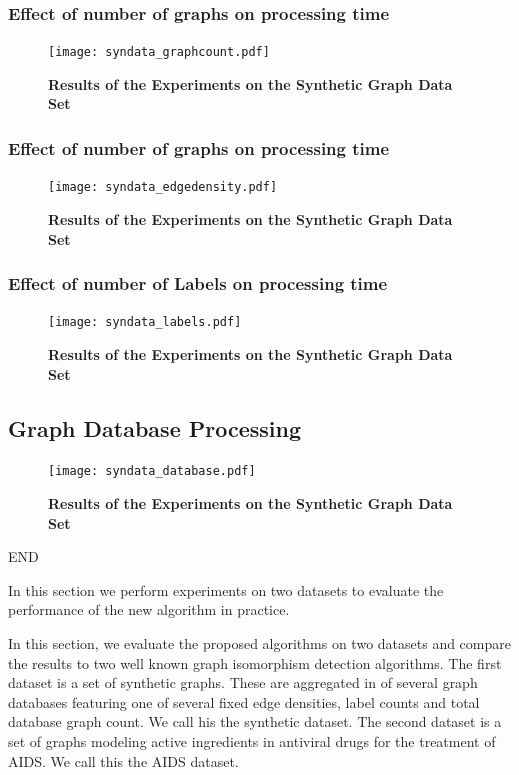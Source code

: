 \subsubsection{Effect of number of graphs on processing time}

\begin{figure}[H]
\centering
\texttt{[image: syndata\_graphcount.pdf]}
\caption{\textbf{Results of the Experiments on the Synthetic Graph Data Set}} 
\label{fig:graphcount}
\end{figure}


\subsubsection{Effect of number of graphs on processing time}

\begin{figure}[H]
\centering
\texttt{[image: syndata\_edgedensity.pdf]}
\caption{\textbf{Results of the Experiments on the Synthetic Graph Data Set}} 
\label{fig:edgedensity}
\end{figure}


\subsubsection{Effect of number of Labels on processing time}

\begin{figure}[H]
\centering
\texttt{[image: syndata\_labels.pdf]}
\caption{\textbf{Results of the Experiments on the Synthetic Graph Data Set}}
\label{fig:labels}
\end{figure}


\subsection{Graph Database Processing}

\begin{figure}[H]
\centering
\texttt{[image: syndata\_database.pdf]}
\caption{\textbf{Results of the Experiments on the Synthetic Graph Data Set}}
\label{fig:database}
\end{figure}

END

In this section we perform experiments on two datasets to evaluate the performance of the new algorithm in practice.

In this section, we evaluate the proposed algorithms on two datasets and compare the results to two well known graph isomorphism detection algorithms. The first dataset is a set of synthetic graphs. These are aggregated in of several graph databases featuring one of several fixed edge densities, label counts and total database graph count. We call his the synthetic dataset. The second dataset is  a set of graphs modeling active ingredients in antiviral drugs for the treatment of AIDS. We call this the AIDS dataset. 

